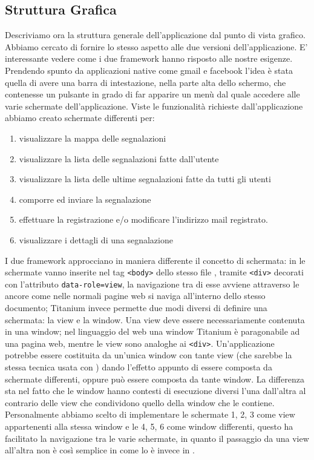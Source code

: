 		\subsection{Struttura Grafica}
		\label{subsec:structgraphic}
			Descriviamo ora la struttura generale dell'applicazione dal punto 
			di vista grafico.
			Abbiamo cercato di fornire lo stesso aspetto alle due versioni 
			dell'applicazione. E' interessante vedere come i due framework hanno risposto 
			alle nostre esigenze. Prendendo spunto da applicazioni native come 
			gmail e facebook l'idea è stata quella di avere una barra di intestazione, 
			nella parte alta dello schermo, che contenesse un pulsante in grado di 
			far apparire un menù dal quale accedere alle varie schermate dell'applicazione.
			Viste le funzionalità richieste dall'applicazione abbiamo creato schermate 
			differenti per:
			\begin{enumerate} 
				\item visualizzare la mappa delle segnalazioni 
				\item visualizzare la lista delle segnalazioni fatte dall'utente
				\item visualizzare la lista delle ultime segnalazioni fatte da tutti gli utenti
				\item comporre ed inviare la segnalazione
				\item effettuare la registrazione e/o modificare l'indirizzo mail registrato.
				\item visualizzare i dettagli di una segnalazione
			\end{enumerate}
			
			\noindent I due framework approcciano in maniera differente il concetto di schermata: 
			in \kendomob{} le schermate vanno inserite nel tag \verb|<body>| dello stesso 
			file \html{}, tramite \verb|<div>| decorati con l'attributo \verb|data-role=view|, la 
			navigazione tra di esse avviene attraverso le ancore come nelle normali 
			pagine web si naviga all'interno dello stesso documento; Titanium invece 
			permette due modi diversi di definire una schermata: la view e la window.
			Una view deve essere necessariamente contenuta in una window; nel linguaggio 
			del web una window Titanium è paragonabile ad una pagina web, mentre le view 
			sono analoghe ai \verb|<div>|. Un'applicazione potrebbe essere costituita da un'unica 
			window con tante view (che sarebbe la stessa tecnica usata con \kendomob{}) 
			dando l'effetto appunto di essere composta da schermate differenti, oppure 
			può essere composta da tante window. La differenza sta nel fatto che 
			le window hanno contesti di esecuzione diversi l'una dall'altra al contrario 
			delle view che condividono quello della window che le contiene.
			Personalmente abbiamo scelto di implementare le schermate 1, 2, 3 come 
			view appartenenti alla stessa window e le 4, 5, 6 come window differenti, 
			questo ha facilitato la navigazione tra le varie schermate, in quanto 
			il passaggio da una view all'altra non è così semplice in \tisdk{} come 
			lo è invece in \kendomob{}.
			
